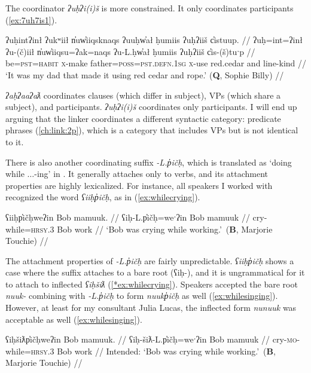 The coordinator \textit{ʔuḥʔi(i)š} is more constrained. It only coordinates participants (\ref{ex:7uh7is1}).

\ex \label{ex:7uh7is1}
\begingl
\glpreamble ʔuḥintʔinł ʔukʷiił n̓uw̓iiqsknaqs ʔuuḥw̓ał ḥumiis ʔuḥʔiiš c̓istuup. //
\gla ʔuḥ=int=ʔinł ʔu-(č)iił n̓uw̓iiqsu=ʔak=naqs ʔu-L.ḥw̓ał ḥumiis ʔuḥʔiiš c̓is-(š)tuˑp //
\glb be=\textsc{pst}=\textsc{habit} \textsc{x}-make father=\textsc{poss}=\textsc{pst.defn.1sg} \textsc{x}-use red.cedar and line-kind //
\glft `It was my dad that made it using red cedar and rope.' (\textbf{Q}, Sophie Billy) //
\endgl
\xe

\textit{ʔaḥʔaaʔaƛ} coordinates clauses (which differ in subject), VPs (which share a subject), and participants. \textit{ʔuḥʔi(i)š} coordinates only participants. I will end up arguing that the linker coordinates a different syntactic category: predicate phrases (\ref{ch:link:2p}), which is a category that includes VPs but is not identical to it.

There is also another coordinating suffix \textit{-L.p̓ičḥ}, which is translated as `doing while $\ldots$-ing' in \cite{sapir1939}. It generally attaches only to verbs, and its attachment properties are highly lexicalized. For instance, all speakers I worked with recognized the word \textit{ʕiiḥp̓ičḥ}, as in (\ref{ex:whilecrying}).

\ex \label{ex:whilecrying}
\begingl
\glpreamble ʕiiḥp̓ičḥweʔin Bob mamuuk. //
\gla ʕiḥ-L.p̓ičḥ=weˑʔin Bob mamuuk //
\glb cry-while=\textsc{hrsy.3} Bob work //
\glft `Bob was crying while working.'\footnotemark{}\ (\textbf{B}, Marjorie Touchie) //
\endgl
\xe


The attachment properties of \textit{-L.p̓ičḥ} are fairly unpredictable. \textit{ʕiiḥp̓ičḥ} shows a case where the suffix attaches to a bare root (ʕiḥ-), and it is ungrammatical for it to attach to inflected \textit{ʕiḥšiƛ} (\ref{*ex:whilecrying}). Speakers accepted the bare root \textit{nuuk-} combining with \textit{-L.p̓ičḥ} to form \textit{nuukp̓ičḥ} as well (\ref{ex:whilesinging}). However, at least for my consultant Julia Lucas, the inflected form \textit{nunuuk} was acceptable as well (\ref{ex:whilesinging}).

\ex \label{*ex:whilecrying}
\begingl
\glpreamble *ʕiḥšiƛp̓ičḥweʔin Bob mamuuk. //
\gla ʕiḥ-šiƛ-L.p̓ičḥ=weˑʔin Bob mamuuk //
\glb cry-\textsc{mo}-while=\textsc{hrsy.3} Bob work //
\glft Intended: `Bob was crying while working.'\footnotemark{}\ (\textbf{B}, Marjorie Touchie) //
\endgl
\xe

